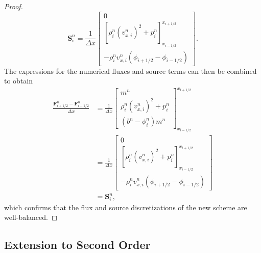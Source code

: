 \begin{proof}
\begin{equation*}
\mathbf{S}_i^n=\frac{1}{\Delta x}
\begin{bmatrix}
0 \\ \left[\rho_i^n\left(v_{x,i}^n\right)^2+p_i^n\right]_{x_{i-1/2}}^{x_{i+1/2}} \\ -\rho_i^n v_{x,i}^n\left(\phi_{i+1/2}-\phi_{i-1/2}\right)
\end{bmatrix}.
\end{equation*}
The expressions for the numerical fluxes and source terms can then be combined to obtain
\begin{align*}
\frac{\mathbf{F}_{i+1/2}^n-\mathbf{F}_{i-1/2}^n}{\Delta x}&=\frac{1}{\Delta x}
\begin{bmatrix}
m^n \\ \rho_i^n\left(v_{x,i}^n\right)^2+p_i^n \\ \left(b^n-\phi_i^n\right)m^n
\end{bmatrix}_{x_{i-1/2}}^{x_{i+1/2}} \\
&=\frac{1}{\Delta x}
\begin{bmatrix}
0 \\ \left[\rho_i^n\left(v_{x,i}^n\right)^2+p_i^n\right]_{x_{i-1/2}}^{x_{i+1/2}} \\ -\rho_i^n v_{x,i}^n\left(\phi_{i+1/2}-\phi_{i-1/2}\right)
\end{bmatrix} \\
&=\mathbf{S}_i^n,
\end{align*}
which confirms that the flux and source discretizations of the new scheme are well-balanced.
\end{proof}

\subsection{Extension to Second Order}
\label{subsec:secondOrder}

